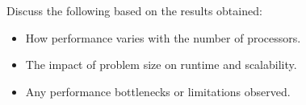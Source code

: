 Discuss the following based on the results obtained:
\begin{itemize}
    \item How performance varies with the number of processors.
    \item The impact of problem size on runtime and scalability.
    \item Any performance bottlenecks or limitations observed.
\end{itemize}